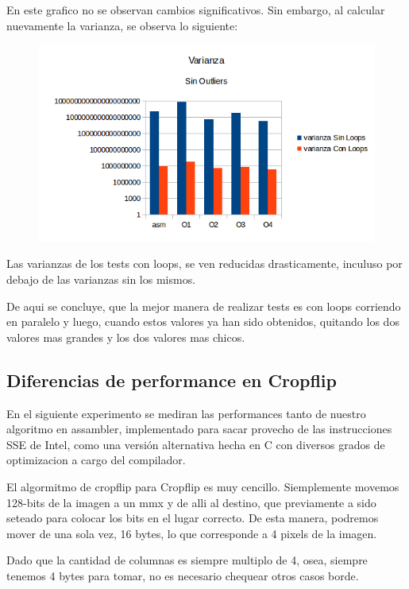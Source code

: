 \documentclass[a4paper]{article}
\begin{document}
En este grafico no se observan cambios significativos. Sin embargo, al calcular nuevamente la varianza, se observa lo siguiente:

\begin{figure}[h!]
  \begin{center}
	\includegraphics[scale=0.66]{GraficosTesting/crop/VSO.png}
	\label{nombreparareferenciar4}
  \end{center}
\end{figure}

Las varianzas de los tests con loops, se ven reducidas drasticamente, inculuso por debajo de las varianzas sin los mismos.

De aqui se concluye, que la mejor manera de realizar tests es con loops corriendo en paralelo y luego, cuando estos valores ya han sido obtenidos, quitando los dos valores mas grandes y los dos valores mas chicos.

\newpage
\subsection{Diferencias de performance en Cropflip}
En el siguiente experimento se mediran las performances tanto de nuestro algoritmo en assambler, implementado para sacar provecho de las instrucciones SSE de Intel, como una versión alternativa hecha en C con diversos grados de optimizacion a cargo del compilador.

El algormitmo de cropflip para Cropflip es muy cencillo. Siemplemente movemos 128-bits de la imagen a un mmx y de alli al destino, que previamente a sido seteado para colocar los bits en el lugar correcto. De esta manera, podremos mover de una sola vez, 16 bytes, lo que corresponde a 4 pixels de la imagen.

Dado que la cantidad de columnas es siempre multiplo de 4, osea, siempre tenemos 4 bytes para tomar, no es necesario chequear otros casos borde.
\end{document}
